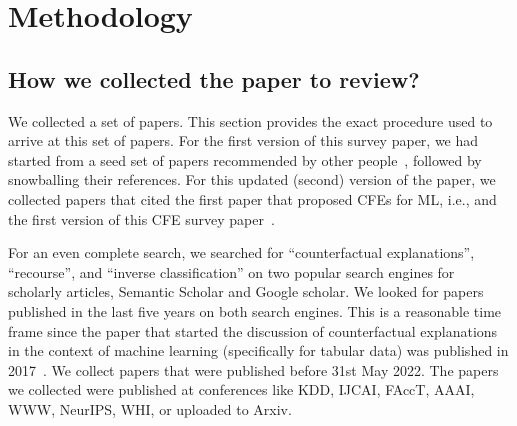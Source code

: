 \section{Methodology}
\label{sec:method}



\subsection{How we collected the paper to review?}
We collected a set of \papers papers. This section provides the exact procedure used to arrive at this set of papers. 
For the first version of this survey paper, we had started from a seed set of papers recommended by other people~\cite{mahajan_preserving_2020,mothilal_explaining_2020,ramakrishnan_synthesizing_2019,Ustun19:Actionable,wachter_counterfactual_2017}, followed by snowballing their references. 
For this updated (second) version of the paper, we collected papers that cited the first paper that proposed CFEs for ML, i.e., \citet{wachter_counterfactual_2017} and the first version of this CFE survey paper~\citep{first-version-cfesurvey}. 

For an even complete search, we searched for ``counterfactual explanations'', ``recourse'', and ``inverse classification'' on two popular search engines for scholarly articles, Semantic Scholar and Google scholar. 
We looked for papers published in the last five years on both search engines. 
This is a reasonable time frame since the paper that started the discussion of counterfactual explanations in the context of machine learning (specifically for tabular data) was published in 2017~\citep{wachter_counterfactual_2017}. 
We collect papers that were published before 31st May 2022. 
The papers we collected were published at conferences like KDD, IJCAI, FAccT, AAAI, WWW, NeurIPS, WHI, or uploaded to Arxiv. %

